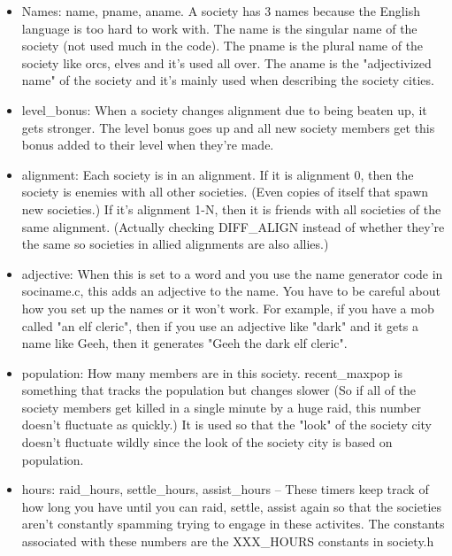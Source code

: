 \begin{itemize}

\item Names: name, pname, aname. A society has 3 names because the English
  language is too hard to work with. The name is the singular name of the
  society (not used much in the code). The pname is the plural name of the
  society like orcs, elves and it's used all over. The aname is the
  "adjectivized name" of the society and it's mainly used when describing the
  society cities.

\item level\_bonus: When a society changes alignment due to being beaten
up, it gets stronger. The level bonus goes up and all new society members
get this bonus added to their level when they're made.

\item alignment: Each society is in an alignment. If it is alignment 0, then
the society is enemies with all other societies. (Even copies of itself
that spawn new societies.) If it's alignment 1-N, then it is friends
with all societies of the same alignment. (Actually checking DIFF\_ALIGN
instead of whether they're the same so societies in allied alignments
are also allies.)

\item adjective: When this is set to a word and you use the name generator
  code in sociname.c, this adds an adjective to the name. You have to be
  careful about how you set up the names or it won't work. For example, if you
  have a mob called "an elf cleric", then if you use an adjective like "dark"
  and it gets a name like Geeh, then it generates "Geeh the dark elf cleric".



\item population: How many members are in this society. recent\_maxpop is
  something that tracks the population but changes slower (So if all of
the society members get killed in a single minute by a huge raid, this
number doesn't fluctuate as quickly.) It is used so that the "look" of
the society city doesn't fluctuate wildly since the look of the
society city is based on population.

\item hours: raid\_hours, settle\_hours, assist\_hours -- These timers
keep track of how long you have until you can raid, settle, assist
again so that the societies aren't constantly spamming trying to
engage in these activites. The constants associated with these numbers
are the XXX\_HOURS constants in society.h


\end{itemize}
